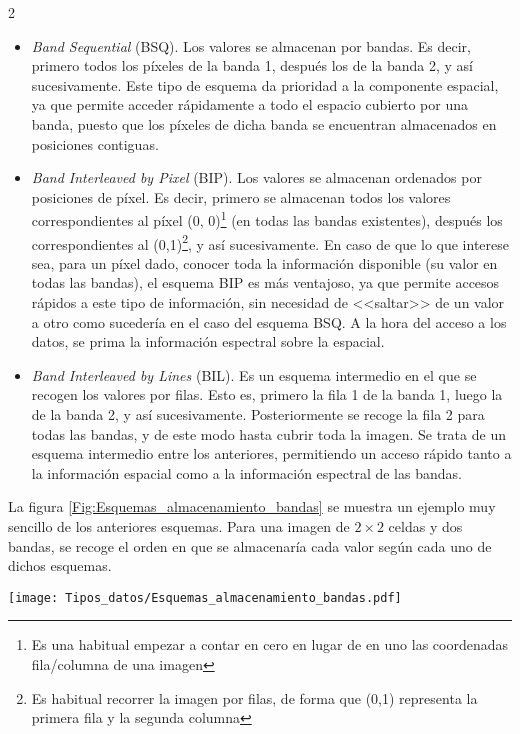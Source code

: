 \begin{multicols}{2}
\begin{itemize}
	\item \emph{Band Sequential} (BSQ). Los valores se almacenan por bandas. Es decir, primero todos los píxeles de la banda 1, después los de la banda 2, y así sucesivamente. Este tipo de esquema da prioridad a la componente espacial, ya que permite acceder rápidamente a todo el espacio cubierto por una banda, puesto que los píxeles de dicha banda se encuentran almacenados en posiciones contiguas.
	\item \emph{Band Interleaved by Pixel} (BIP). Los valores se almacenan ordenados por posiciones de píxel. Es decir, primero se almacenan todos los valores correspondientes al píxel (0, 0)\footnote{Es una habitual empezar a contar en cero en lugar de en uno las coordenadas fila/columna de una imagen} (en todas las bandas existentes), después los correspondientes al (0,1)\footnote{Es habitual recorrer la imagen por filas, de forma que (0,1) representa la primera fila y la segunda columna}, y así sucesivamente.
	En caso de que lo que interese sea, para un píxel dado, conocer toda la información disponible (su valor en todas las bandas), el esquema BIP es más ventajoso, ya que permite accesos rápidos a este tipo de información, sin necesidad de <<saltar>> de un valor a otro como sucedería en el caso del esquema BSQ. A la hora del acceso a los datos, se prima la información espectral sobre la espacial.
	\item \emph{Band Interleaved by Lines} (BIL). Es un esquema intermedio en el que se recogen los valores por filas. Esto es, primero la fila 1 de la banda 1, luego la de la banda 2, y así sucesivamente. Posteriormente se recoge la fila 2 para todas las bandas, y de este modo hasta cubrir toda la imagen. Se trata de un esquema intermedio entre los anteriores, permitiendo un acceso rápido tanto a la información espacial como a la información espectral de las bandas.
\end{itemize}

La figura \ref{Fig:Esquemas_almacenamiento_bandas} se muestra un ejemplo muy sencillo de los anteriores esquemas. Para una imagen de $2\times 2$ celdas y dos bandas, se recoge el orden en que se almacenaría cada valor según cada uno de dichos esquemas.

\begin{figure*}[ht]   
\centering
\texttt{[image: Tipos\_datos/Esquemas\_almacenamiento\_bandas.pdf]}
\caption{\small Esquemas de almacenamiento para imágenes multibanda. Los números indican el orden en que se almacena cada valor.}
\label{Fig:Esquemas_almacenamiento_bandas} 
\end{figure*}


\end{multicols}
